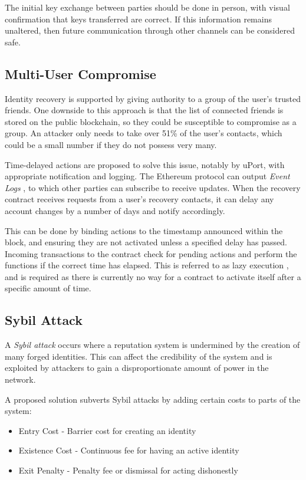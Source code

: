 The initial key exchange between parties should be done in person, with visual confirmation that keys transferred are correct. If this information remains unaltered, then future communication through other channels can be considered safe.

\subsection{Multi-User Compromise}
Identity recovery is supported by giving authority to a group of the user's trusted friends. One downside to this approach is that the list of connected friends is stored on the public blockchain, so they could be susceptible to compromise as a group. An attacker only needs to take over 51\% of the user's contacts, which could be a small number if they do not possess very many.

Time-delayed actions are proposed to solve this issue, notably by uPort, with appropriate notification and logging. The Ethereum protocol can output \textit{Event Logs} \cite{chow_technical_2016}, to which other parties can subscribe to receive updates. When the recovery contract receives requests from a user's recovery contacts, it can delay any account changes by a number of days and notify accordingly. 

This can be done by binding actions to the timestamp announced within the block, and ensuring they are not activated unless a specified delay has passed. Incoming transactions to the contract check for pending actions and perform the functions if the correct time has elapsed. This is referred to as lazy execution \cite{merriam_how_2016}, and is required as there is currently no way for a contract to activate itself after a specific amount of time.

\subsection{Sybil Attack}
A \textit{Sybil attack} \cite{douceur_sybil_2002} occurs where a reputation system is undermined by the creation of many forged identities. This can affect the credibility of the system and is exploited by attackers to gain a disproportionate amount of power in the network.

A proposed solution \cite{williams_byzantine_2015} subverts Sybil attacks by adding certain costs to parts of the system:
\begin{itemize}
  \item Entry Cost - Barrier cost for creating an identity
  \item Existence Cost - Continuous fee for having an active identity
  \item Exit Penalty - Penalty fee or dismissal for acting dishonestly
\end{itemize}

